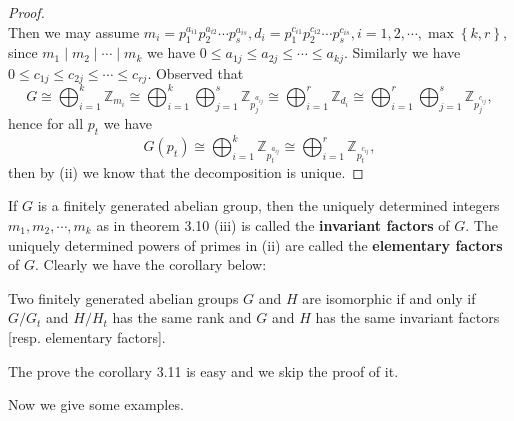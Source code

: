 \begin{proof}
$$$$
Then we may assume $m_i=p_{1}^{a_{i1}}p_{2}^{a_{i2}}\cdots p_{s}^{a_{is}},d_i=p_{1}^{c_{i1}}p_{2}^{c_{i2}}\cdots p_{s}^{c_{is}},i=1,2,\cdots ,\max \left\{ k,r \right\} $, since $m_1\mid m_2\mid\cdots\mid m_k$ we have $0\le a_{1j}\le a_{2j}\le \cdots \le a_{kj}$. Similarly we have $0\le c_{1j}\le c_{2j}\le \cdots \le c_{rj}$. Observed that 
$$
G\cong \bigoplus_{i=1}^k{\mathbb{Z} _{m_i}}\cong \bigoplus_{i=1}^k{\bigoplus_{j=1}^s{\mathbb{Z} _{p_{j}^{a_{ij}}}}}\cong \bigoplus_{i=1}^r{\mathbb{Z} _{d_i}}\cong \bigoplus_{i=1}^r{\bigoplus_{j=1}^s{\mathbb{Z} _{p_{j}^{c_{ij}}}}},
$$
hence for all $p_t$ we have 
$$
G\left( p_t \right) \cong \bigoplus_{i=1}^k{\mathbb{Z} _{p_{t}^{a_{ij}}}}\cong \bigoplus_{i=1}^r{\mathbb{Z} _{p_{t}^{c_{ij}}}},
$$
then by (ii) we know that the decomposition is unique.
\end{proof}
If $G$ is a finitely generated abelian group, then the uniquely determined integers $m_1,m_2,\cdots,m_k$ as in theorem 3.10 (iii) is called the \textbf{invariant factors} of $G$. The uniquely determined powers of primes in (ii) are called the \textbf{elementary factors} of $G$. Clearly we have the corollary below:
\begin{corollary}
Two finitely generated abelian groups $G$ and $H$ are isomorphic if and only if $G/G_t$ and $H/H_t$ has the same rank and $G$ and $H$ has the same invariant factors [resp. elementary factors].
\end{corollary}
The prove the corollary 3.11 is easy and we skip the proof of it.\par
Now we give some examples.
